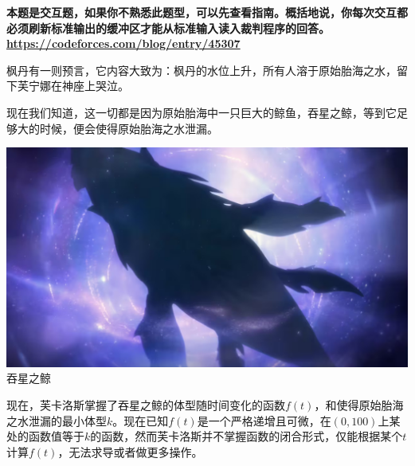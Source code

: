 \textbf {本题是交互题，如果你不熟悉此题型，可以先查看指南。概括地说，你每次交互都必须刷新标准输出的缓冲区才能从标准输入读入裁判程序的回答。\url{https://codeforces.com/blog/entry/45307}}

枫丹有一则预言，它内容大致为：枫丹的水位上升，所有人溶于原始胎海之水，留下芙宁娜在神座上哭泣。

现在我们知道，这一切都是因为原始胎海中一只巨大的鲸鱼，吞星之鲸，等到它足够大的时候，便会使得原始胎海之水泄漏。


\begin{center}
  \includegraphics[scale=0.4]{whale.jpg} \\
  \small{吞星之鲸}
\end{center}

现在，芙卡洛斯掌握了吞星之鲸的体型随时间变化的函数$f(t)$，和使得原始胎海之水泄漏的最小体型$k$。现在已知$f(t)$是一个严格递增且可微，在$(0, 100)$上某处的函数值等于$k$的函数，然而芙卡洛斯并不掌握函数的闭合形式，仅能根据某个$t$计算$f(t)$，无法求导或者做更多操作。